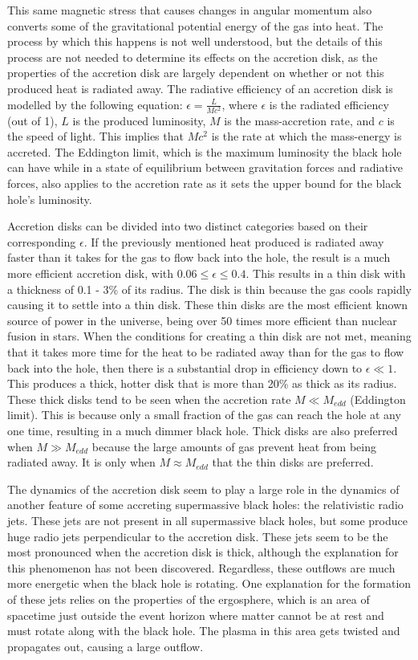 \documentclass[12pt]{article}
\begin{document}
This same magnetic stress that causes changes in angular momentum also
converts some of the gravitational potential energy of the gas into heat.
The process by which this happens is not well understood, but the details of
this process are not needed to determine its effects on the accretion disk,
as the properties of the accretion disk are largely dependent on whether or
not this produced heat is radiated away.  The radiative efficiency of an
accretion disk is modelled by the following equation:
$\epsilon = \frac{L}{Mc^2}$, where $\epsilon$ is the radiated efficiency
(out of 1), $L$ is the produced luminosity, $M$ is the mass-accretion rate,
and $c$ is the speed of light.  This implies that $Mc^2$ is the rate at
which the mass-energy is accreted.  The Eddington limit, which is the maximum
luminosity the black hole can have while in a state of equilibrium between
gravitation forces and radiative forces, also applies to the
accretion rate as it sets the upper bound for the black hole's luminosity.

Accretion disks can be divided into two
distinct categories based on their corresponding $\epsilon$.  If the
previously mentioned heat produced is radiated away faster than it
takes for the gas to flow back into the hole, the result is a much more
efficient accretion disk, with $0.06 \le \epsilon \le 0.4$.  This results in
a thin disk with a thickness of 0.1 - 3\% of its radius.  The disk is thin
because the gas cools rapidly causing it to settle into a thin disk.  These
thin disks are the most efficient known source of power in the universe,
being over 50 times more efficient than nuclear fusion in stars.  When the
conditions for creating a thin disk are not met, meaning that it takes more
time for the heat to be radiated away than for the gas to flow back into the
hole, then there is a substantial drop in efficiency down to $\epsilon \ll
1$.  This produces a thick, hotter disk that is more than 20\% as thick as
its radius.  These thick disks tend to be seen when the accretion rate $M
\ll M_{edd}$ (Eddington limit).  This is because only a small fraction of
the gas can reach
the hole at any one time, resulting in a much dimmer black hole.  Thick disks
are also preferred when $M \gg M_{edd}$ because the large amounts of gas
prevent heat from being radiated away.  It is only when $M \approx M_{edd}$
that the thin disks are preferred.

The dynamics of the accretion disk seem to play a large role in the dynamics of
another feature of some accreting supermassive black holes: the relativistic
radio jets.  These jets are not present in all supermassive black holes, but
some produce huge radio jets perpendicular to the accretion disk.  These jets
seem to be the most pronounced when the accretion disk is thick, although the
explanation for this phenomenon has not been discovered.  Regardless, these
outflows are much more energetic when the black hole is rotating.  One explanation
for the formation of these jets relies on the properties of the ergosphere,
which is an area of spacetime just outside the event horizon where matter cannot
be at rest and must rotate along with the black hole.  The plasma in this area
gets twisted and propagates out, causing a large outflow.
\end{document}
